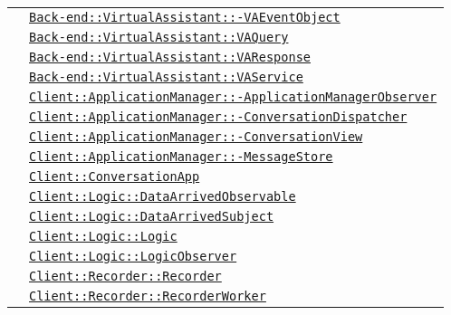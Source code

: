 \begin{longtable}{|>{\centering}m{3cm}|m{10cm}<{\centering}|}
& \hyperref[Back-end::VirtualAssistant::VAEventObject]{\texttt{Back-end::VirtualAssistant::-\linebreak VAEventObject}}\\
& \hyperref[Back-end::VirtualAssistant::VAQuery]{\texttt{Back-end::VirtualAssistant::VAQuery}}\\
& \hyperref[Back-end::VirtualAssistant::VAResponse]{\texttt{Back-end::VirtualAssistant::VAResponse}}\\
& \hyperref[Back-end::VirtualAssistant::VAService]{\texttt{Back-end::VirtualAssistant::VAService}}\\
& \hyperref[Client::ApplicationManager::ApplicationManagerObserver]{\texttt{Client::ApplicationManager::-\linebreak ApplicationManagerObserver}}\\
& \hyperref[Client::ApplicationManager::ConversationDispatcher]{\texttt{Client::ApplicationManager::-\linebreak ConversationDispatcher}}\\
& \hyperref[Client::ApplicationManager::ConversationView]{\texttt{Client::ApplicationManager::-\linebreak ConversationView}}\\
& \hyperref[Client::ApplicationManager::MessageStore]{\texttt{Client::ApplicationManager::-\linebreak MessageStore}}\\
& \hyperref[Client::ConversationApp]{\texttt{Client::ConversationApp}}\\
& \hyperref[Client::Logic::DataArrivedObservable]{\texttt{Client::Logic::DataArrivedObservable}}\\
& \hyperref[Client::Logic::DataArrivedSubject]{\texttt{Client::Logic::DataArrivedSubject}}\\
& \hyperref[Client::Logic::Logic]{\texttt{Client::Logic::Logic}}\\
& \hyperref[Client::Logic::LogicObserver]{\texttt{Client::Logic::LogicObserver}}\\
& \hyperref[Client::Recorder::Recorder]{\texttt{Client::Recorder::Recorder}}\\
& \hyperref[Client::Recorder::RecorderWorker]{\texttt{Client::Recorder::RecorderWorker}}\\ \hline


\end{longtable}
